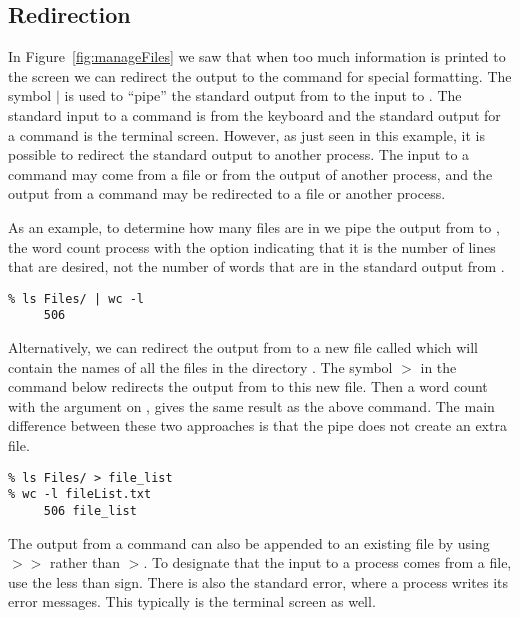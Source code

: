 \subsection{Redirection}
In Figure~\ref{fig:manageFiles} we saw that when too much information
is printed to the screen we can redirect the output to the command 
for special formatting.  The symbol $|$ is used to ``pipe'' the
standard output from  to the input to .
The standard input to a command is from the keyboard and the standard
output for a command is the terminal screen. However, as just
seen in this example, it is possible to redirect the standard output to
another process. The input to a command may come
from a file or from the output of another process, and the output from
a command may be redirected to a file or another process. 


As an example, to determine how many files are in  we pipe the
output from  to , the word count
process with the option  indicating that it is the number
of lines that are desired, not the number of words that are in the
standard output from .
\begin{verbatim}
% ls Files/ | wc -l
     506
\end{verbatim}
Alternatively, we can redirect the output from  to a new
file called  which
will contain the names of all the files in the directory
.  The symbol $>$ in the command below redirects the
output from  to this new file. 
Then a word count with the  argument on ,
gives the same result as the above command.
The main difference between these two approaches is that the pipe does
not create an extra file.
\begin{verbatim}
% ls Files/ > file_list
% wc -l fileList.txt 
     506 file_list
\end{verbatim}


The output from a command can also be appended to an existing file by
using $>$$>$ rather than $>$.  To designate that the input to a process
comes from a file, use the less than sign.
There is also the standard error, where a process writes its error
messages. This typically is the terminal screen as well.


